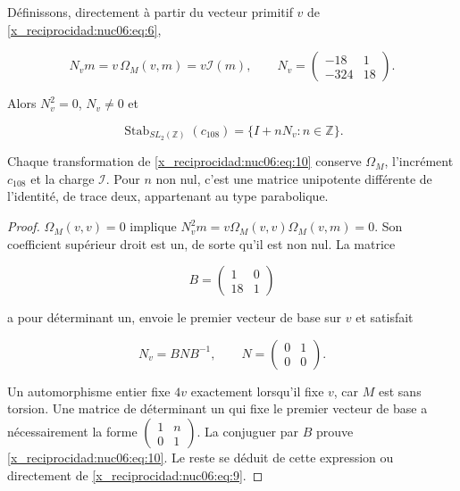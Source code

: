 \begin{theorem}

Définissons, directement à partir du vecteur primitif \(v\) de \eqref{x_reciprocidad:nuc06:eq:6},

\begin{equation}
N_v m=v\,\Omega_M(v,m)=v\mathcal I(m),\qquad
N_v=\begin{pmatrix}-18&1\\-324&18\end{pmatrix}.
\label{x_reciprocidad:nuc06:eq:9}
\end{equation}

Alors \(N_v^2=0\), \(N_v\ne0\) et

\begin{equation}
\boxed{\quad
\operatorname{Stab}_{SL_2(\mathbb Z)}(c_{108})
=\{I+nN_v:n\in\mathbb Z\}.
\quad}
\label{x_reciprocidad:nuc06:eq:10}
\end{equation}

Chaque transformation de \eqref{x_reciprocidad:nuc06:eq:10} conserve \(\Omega_M\), l’incrément \(c_{108}\) et la charge \(\mathcal I\). Pour \(n\) non nul, c’est une matrice unipotente différente de l’identité, de trace deux, appartenant au type parabolique.
\end{theorem}

\begin{proof}
\(\Omega_M(v,v)=0\) implique \(N_v^2m=v\Omega_M(v,v)\Omega_M(v,m)=0\). Son coefficient supérieur droit est un, de sorte qu’il est non nul. La matrice

\[
B=\begin{pmatrix}1&0\\18&1\end{pmatrix}
\]

a pour déterminant un, envoie le premier vecteur de base sur \(v\) et satisfait

\begin{equation}
N_v=BNB^{-1},\qquad N=\begin{pmatrix}0&1\\0&0\end{pmatrix}.
\label{x_reciprocidad:nuc06:eq:11}
\end{equation}

Un automorphisme entier fixe \(4v\) exactement lorsqu’il fixe \(v\), car \(M\) est sans torsion. Une matrice de déterminant un qui fixe le premier vecteur de base a nécessairement la forme \(\begin{pmatrix}1&n\\0&1\end{pmatrix}\). La conjuguer par \(B\) prouve \eqref{x_reciprocidad:nuc06:eq:10}. Le reste se déduit de cette expression ou directement de \eqref{x_reciprocidad:nuc06:eq:9}.
\end{proof}

